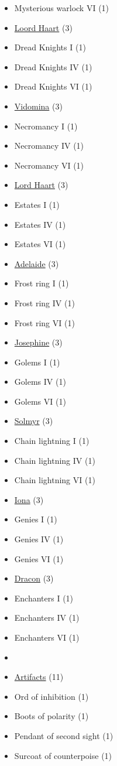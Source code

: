 \begin{multicols}{3}
\begin{itemize}[leftmargin=0pt, label={}, noitemsep, noitemsep]
  \item Mysterious warlock VI (1)
  \item \underline{Loord Haart} (3)
  \item Dread Knights I (1)
  \item Dread Knights IV (1)
  \item Dread Knights VI (1)
  \item \underline{Vidomina} (3)
  \item Necromancy I (1)
  \item Necromancy IV (1)
  \item Necromancy VI (1)
  \item \underline{Lord Haart} (3)
  \item Estates I (1)
  \item Estates IV (1)
  \item Estates VI (1)
  \item \underline{Adelaide} (3)
  \item Frost ring I (1)
  \item Frost ring IV (1)
  \item Frost ring VI (1)
  \item \underline{Josephine} (3)
  \item Golems I (1)
  \item Golems IV (1)
  \item Golems VI (1)
  \item \underline{Solmyr} (3)
  \item Chain lightning I (1)
  \item Chain lightning IV (1)
  \item Chain lightning VI (1)
  \item \underline{Iona} (3)
  \item Genies I (1)
  \item Genies IV (1)
  \item Genies VI (1)
  \item \underline{Dracon} (3)
  \item Enchanters I (1)
  \item Enchanters IV (1)
  \item Enchanters VI (1)
  \item
  \item \underline{Artifacts} (11)
  \item Ord of inhibition (1)
  \item Boots of polarity (1)
  \item Pendant of second sight (1)
  \item Surcoat of counterpoise (1)

\end{itemize}
\end{multicols}
